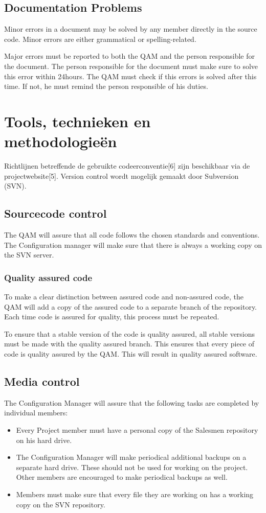 \documentclass[salesmen, twoside]{../../../templates/latex/2009/softproj}
\begin{document}
\begin{projdoc}
\section{Documentation Problems}
Minor errors in a document may be solved by any member directly in the source code. Minor errors are either grammatical or spelling-related.

Major errors must be reported to both the QAM and the person responsible for the document. The person responsible for the document must make sure to solve this error within 24hours. The QAM must check if this errors is solved after this time. If not, he must remind the person responsible of his duties.

\chapter{Tools, technieken en methodologie\"en}
Richtlijnen betreffende de gebruikte codeerconventie[6] zijn beschikbaar via de projectwebsite[5].  Version control wordt mogelijk gemaakt door Subversion (SVN).

\section{Sourcecode control}
The QAM will assure that all code follows the chosen standards and conventions. The Configuration manager will make sure that there is always a working copy on the SVN server.

\subsection{Quality assured code}
To make a clear distinction between assured code and non-assured code, the QAM will add a copy of the assured code to a separate branch of the repository. Each time code is assured for quality, this process must be repeated.

To ensure that a stable version of the code is quality assured, all stable versions must be made with the quality assured branch. This ensures that every piece of code is quality assured by the QAM. This will result in quality assured software.

\section{Media control}
The Configuration Manager will assure that the following tasks are completed by individual members:
\begin{itemize}
\item
Every Project member must have a personal copy of the Salesmen repository on his hard drive.
\item
The Configuration Manager will make periodical additional backups on a separate hard drive. These should not be used for working on the project. Other members are encouraged to make periodical backups as well.
\item
Members must make sure that every file they are working on has a working copy on the SVN repository.
\end{itemize}


\end{projdoc}
\end{document}
